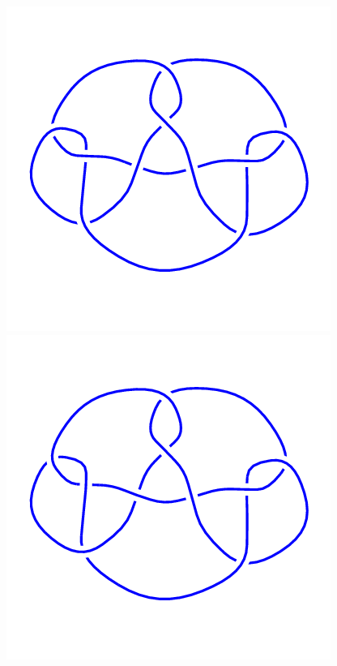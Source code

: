 \begin{figure}[H]
    \begin{minipage}[b]{.18\linewidth}
        \centering
        \includegraphics[width=\linewidth]{../data/10_137.png}
    \end{minipage}
    \begin{minipage}[b]{.18\linewidth}
        \centering
        \includegraphics[width=\linewidth]{../data/10_138.png}

\end{minipage}
\end{figure}
